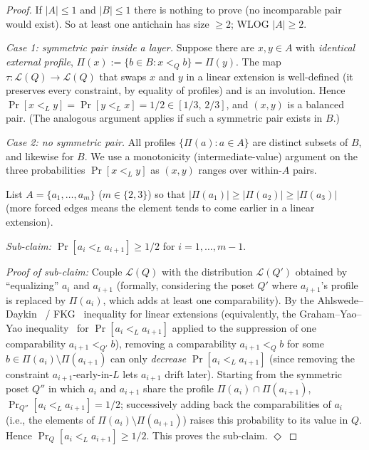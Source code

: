 \begin{proof}
If $|A| \le 1$ and $|B| \le 1$ there is nothing to prove (no
incomparable pair would exist). So at least one antichain has size
$\ge 2$; WLOG $|A| \ge 2$.

\medskip\noindent\emph{Case 1: symmetric pair inside a layer.} Suppose
there are $x, y \in A$ with \emph{identical external profile},
$\Pi(x) := \{b \in B : x <_Q b\} = \Pi(y)$. The map
$\tau: \mathcal L(Q) \to \mathcal L(Q)$ that swaps $x$ and $y$ in a
linear extension is well-defined (it preserves every constraint, by
equality of profiles) and is an involution. Hence
$\Pr[x <_L y] = \Pr[y <_L x] = 1/2 \in [1/3,\,2/3]$, and $(x,y)$ is a
balanced pair. (The analogous argument applies if such a symmetric
pair exists in $B$.)

\medskip\noindent\emph{Case 2: no symmetric pair.} All profiles
$\{\Pi(a) : a \in A\}$ are distinct subsets of $B$, and likewise for
$B$. We use a monotonicity (intermediate-value) argument on the three
probabilities $\Pr[x <_L y]$ as $(x, y)$ ranges over within-$A$ pairs.

List $A = \{a_1, \ldots, a_m\}$ ($m \in \{2, 3\}$) so that
$|\Pi(a_1)| \ge |\Pi(a_2)| \ge |\Pi(a_3)|$ (more forced edges means
the element tends to come earlier in a linear extension).

\emph{Sub-claim:} $\Pr[a_i <_L a_{i+1}] \ge 1/2$ for $i = 1, \ldots,
m-1$.

\emph{Proof of sub-claim:} Couple $\mathcal L(Q)$ with the
distribution $\mathcal L(Q')$ obtained by ``equalizing'' $a_i$ and
$a_{i+1}$ (formally, considering the poset $Q'$ where $a_{i+1}$'s
profile is replaced by $\Pi(a_i)$, which adds at least one
comparability). By the Ahlswede--Daykin~\cite{AhlswedeDaykin1978} /
FKG~\cite{FKG1971} inequality for linear extensions (equivalently, the
Graham--Yao--Yao inequality~\cite{GrahamYaoYao1980}
for $\Pr[a_i <_L a_{i+1}]$ applied to the suppression of one
comparability $a_{i+1} <_{Q'} b$), removing a comparability
$a_{i+1} <_Q b$ for some $b \in \Pi(a_i) \setminus \Pi(a_{i+1})$ can
only \emph{decrease} $\Pr[a_i <_L a_{i+1}]$ (since removing the
constraint $a_{i+1}$-early-in-$L$ lets $a_{i+1}$ drift later). Starting
from the symmetric poset $Q''$ in which $a_i$ and $a_{i+1}$ share the
profile $\Pi(a_i) \cap \Pi(a_{i+1})$, $\Pr_{Q''}[a_i <_L a_{i+1}] =
1/2$; successively adding back the comparabilities of $a_i$ (i.e., the
elements of $\Pi(a_i) \setminus \Pi(a_{i+1})$) raises this probability
to its value in $Q$. Hence $\Pr_Q[a_i <_L a_{i+1}] \ge 1/2$. This
proves the sub-claim. \hfill$\Diamond$


\end{proof}
